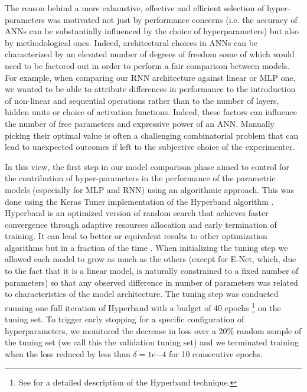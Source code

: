 The reason behind a more exhaustive, effective and efficient selection of hyper-parameters was motivated not just by performance concerns (i.e. the accuracy of ANNs can be substantially influenced by the choice of hyperparameters) but also by methodological ones. Indeed, architectural choices in ANNs can be characterized by an elevated number of degrees of freedom some of which would need to be factored out in order to perform a fair comparison between models. For example, when comparing our RNN architecture against linear or MLP one, we wanted to be able to attribute differences in performance to the introduction of non-linear and sequential operations rather than to the number of layers, hidden units or choice of activation functions. Indeed, these factors can influence the number of free parameters and expressive power of an ANN. Manually picking their optimal value is often a challenging combinatorial problem that can lead to unexpected outcomes if left to the subjective choice of the experimenter. 

In this view, the first step in our model comparison phase aimed to control for the contribution of hyper-parameters in the performance of the parametric models (especially for MLP and RNN) using an algorithmic approach. This was done using the Keras Tuner implementation \cite{omalley2019kerastuner} of the Hyperband algorithm \cite{li2017hyperband}. Hyperband is an optimized version of random search that achieves faster convergence through adaptive resources allocation and early termination of training. It can lead to better or equivalent results to other optimization algorithms but in a fraction of the time \cite{li2017hyperband}. When initializing the tuning step we allowed each model to grow as much as the others (except for E-Net, which,  due to the fact that it is a linear model, is naturally constrained to a fixed number of parameters) so that any observed difference in number of parameters was related to characteristics of the model architecture. The tuning step was conducted running one full iteration of Hyperband with a budget of 40 epochs \footnote{See  \cite{li2017hyperband,hyperwebs} for a detailed description of the Hyperband technique.} on the tuning set. To trigger early stopping for a specific configuration of hyperparameters, we monitored the decrease in loss over a 20\% random sample of the tuning set (we call this the validation tuning set) and we terminated training when the loss reduced by less than $\delta = 1\mathrm{e}{-4}$ for 10 consecutive epochs. 

